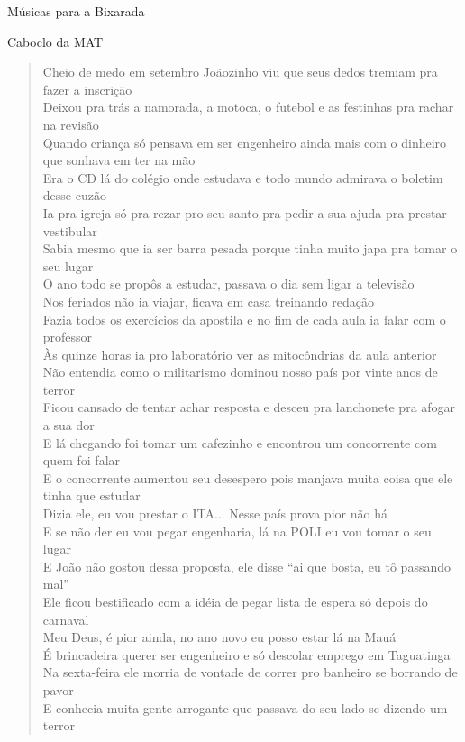 \begin{secao}{Músicas para a Bixarada}
\begin{subsecao}{Caboclo da MAT}
\begin{verse}
Cheio de medo em setembro Joãozinho viu que seus dedos tremiam pra fazer a
inscrição\\
Deixou pra trás a namorada, a motoca, o futebol e as festinhas pra rachar na
revisão\\
Quando criança só pensava em ser engenheiro ainda mais com o dinheiro que
sonhava em ter na mão\\
Era o CD lá do colégio onde estudava e todo mundo admirava o boletim desse
cuzão\\
Ia pra igreja só pra rezar pro seu santo pra pedir a sua ajuda pra prestar
vestibular\\
Sabia mesmo que ia ser barra pesada porque tinha muito japa pra tomar o seu
lugar\\
O ano todo se propôs a estudar, passava o dia sem ligar a televisão\\
Nos feriados não ia viajar, ficava em casa treinando redação\\
Fazia todos os exercícios da apostila e no fim de cada aula ia falar com o
professor\\
Às quinze horas ia pro laboratório ver as mitocôndrias da aula anterior\\
Não entendia como o militarismo dominou nosso país por vinte anos de terror\\
Ficou cansado de tentar achar resposta e desceu pra lanchonete pra afogar a sua
dor\\
E lá chegando foi tomar um cafezinho e encontrou um concorrente com quem foi
falar\\
E o concorrente aumentou seu desespero pois manjava muita coisa que ele tinha
que estudar\\
Dizia ele, eu vou prestar o ITA... Nesse país prova pior não há\\
E se não der eu vou pegar engenharia, lá na POLI eu vou tomar o seu lugar\\
E João não gostou dessa proposta, ele disse ``ai que bosta, eu tô passando mal''\\
Ele ficou bestificado com a idéia de pegar lista de espera só depois do carnaval\\
Meu Deus, é pior ainda, no ano novo eu posso estar lá na Mauá\\
É brincadeira querer ser engenheiro e só descolar emprego em Taguatinga\\
Na sexta-feira ele morria de vontade de correr pro banheiro se borrando de pavor\\
E conhecia muita gente arrogante que passava do seu lado se dizendo um terror\\

\end{verse}
\end{subsecao}
\end{secao}

